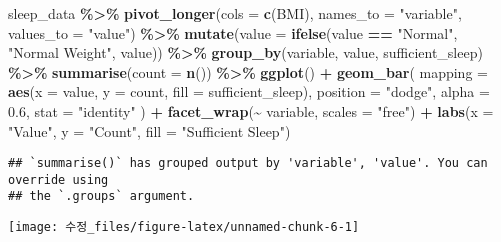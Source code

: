 \documentclass[
  11pt,
]{article}
\newenvironment{Shaded}{\begin{snugshade}}{\end{snugshade}}
\newcommand{\AttributeTok}[1]{\textcolor[rgb]{0.13,0.29,0.53}{#1}}
\newcommand{\FloatTok}[1]{\textcolor[rgb]{0.00,0.00,0.81}{#1}}
\newcommand{\FunctionTok}[1]{\textcolor[rgb]{0.13,0.29,0.53}{\textbf{#1}}}
\newcommand{\NormalTok}[1]{#1}
\newcommand{\SpecialCharTok}[1]{\textcolor[rgb]{0.81,0.36,0.00}{\textbf{#1}}}
\newcommand{\StringTok}[1]{\textcolor[rgb]{0.31,0.60,0.02}{#1}}
\begin{document}
\begin{Shaded}
\begin{Highlighting}[]
\NormalTok{sleep\_data }\SpecialCharTok{\%\textgreater{}\%}
  \FunctionTok{pivot\_longer}\NormalTok{(}\AttributeTok{cols =} \FunctionTok{c}\NormalTok{(BMI), }\AttributeTok{names\_to =} \StringTok{"variable"}\NormalTok{, }\AttributeTok{values\_to =} \StringTok{"value"}\NormalTok{) }\SpecialCharTok{\%\textgreater{}\%}
  \FunctionTok{mutate}\NormalTok{(}\AttributeTok{value =} \FunctionTok{ifelse}\NormalTok{(value }\SpecialCharTok{==} \StringTok{"Normal"}\NormalTok{, }\StringTok{"Normal Weight"}\NormalTok{, value)) }\SpecialCharTok{\%\textgreater{}\%}
  \FunctionTok{group\_by}\NormalTok{(variable, value, sufficient\_sleep) }\SpecialCharTok{\%\textgreater{}\%}
  \FunctionTok{summarise}\NormalTok{(}\AttributeTok{count =} \FunctionTok{n}\NormalTok{()) }\SpecialCharTok{\%\textgreater{}\%}
  \FunctionTok{ggplot}\NormalTok{() }\SpecialCharTok{+}
  \FunctionTok{geom\_bar}\NormalTok{(}
    \AttributeTok{mapping =} \FunctionTok{aes}\NormalTok{(}\AttributeTok{x =}\NormalTok{ value, }\AttributeTok{y =}\NormalTok{ count, }\AttributeTok{fill =}\NormalTok{ sufficient\_sleep),}
    \AttributeTok{position =} \StringTok{"dodge"}\NormalTok{,   }
    \AttributeTok{alpha =} \FloatTok{0.6}\NormalTok{,}
    \AttributeTok{stat =} \StringTok{"identity"}
\NormalTok{  ) }\SpecialCharTok{+}
  \FunctionTok{facet\_wrap}\NormalTok{(}\SpecialCharTok{\textasciitilde{}}\NormalTok{ variable, }\AttributeTok{scales =} \StringTok{"free"}\NormalTok{) }\SpecialCharTok{+}
  \FunctionTok{labs}\NormalTok{(}\AttributeTok{x =} \StringTok{"Value"}\NormalTok{, }\AttributeTok{y =} \StringTok{"Count"}\NormalTok{, }\AttributeTok{fill =} \StringTok{"Sufficient Sleep"}\NormalTok{)}
\end{Highlighting}
\end{Shaded}

\begin{verbatim}
## `summarise()` has grouped output by 'variable', 'value'. You can override using
## the `.groups` argument.
\end{verbatim}

\begin{center}\texttt{[image: 수정\_files/figure-latex/unnamed-chunk-6-1]} \end{center}
\end{document}
